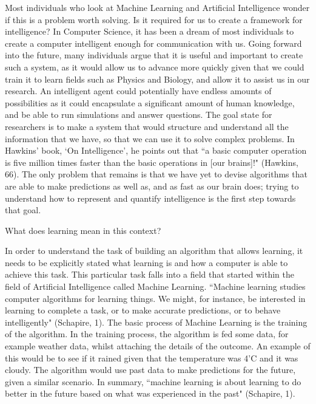 \documentclass[11pt]{article}
\begin{document}
\par Most individuals who look at Machine Learning and Artificial Intelligence wonder if this is a problem worth solving. Is it required for us to create a framework for intelligence? In Computer Science, it has been a dream of most individuals to create a computer intelligent enough for communication with us. Going forward into the future, many individuals argue that it is useful and important to create such a system, as it would allow us to advance more quickly given that we could train it to learn fields such as Physics and Biology, and allow it to assist us in our research. An intelligent agent could potentially have endless amounts of possibilities as it could encapsulate a significant amount of human knowledge, and be able to run simulations and answer questions. The goal state for researchers is to make a system that would structure and understand all the information that we have, so that we can use it to solve complex problems. In Hawkins' book, `On Intelligence', he points out that ``a basic computer operation is five million times faster than the basic operations in [our brains]!" (Hawkins, 66). The only problem that remains is that we have yet to devise algorithms that are able to make predictions as well as, and as fast as our brain does; trying to understand how to represent and quantify intelligence is the first step towards that goal. 
\newline

\begin{center}
	{\large What does learning mean in this context?\par}
\end{center}

\par In order to understand the task of building an algorithm that allows learning, it needs to be explicitly stated what learning is and how a computer is able to achieve this task. This particular task falls into a field that started within the field of Artificial Intelligence called Machine Learning. ``Machine learning studies computer algorithms for learning things. We might, for instance, be interested in learning to complete a task, or to make accurate predictions, or to behave intelligently" (Schapire, 1). The basic process of Machine Learning is the training of the algorithm. In the training process, the algorithm is fed some data, for example weather data, whilst attaching the details of the outcome. An example of this would be to see if it rained given that the temperature was 4'C and it was cloudy. The algorithm would use past data to make predictions for the future, given a similar scenario. In summary, ``machine learning is about learning to do better in the future based on what was experienced in the past" (Schapire, 1).
\end{document}
